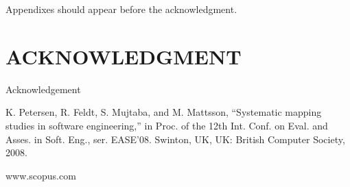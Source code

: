 \documentclass[letterpaper, 10 pt, conference]{ieeeconf}  %
\begin{document}
Appendixes should appear before the acknowledgment.

\section*{ACKNOWLEDGMENT}

Acknowledgement


\begin{thebibliography}{99}

 K. Petersen, R. Feldt, S. Mujtaba, and M. Mattsson, “Systematic mapping studies in software engineering,” in Proc. of the 12th Int. Conf. on Eval. and Asses. in Soft. Eng., ser. EASE’08. Swinton, UK, UK: British Computer Society, 2008.

 www.scopus.com







\end{thebibliography}
\end{document}
